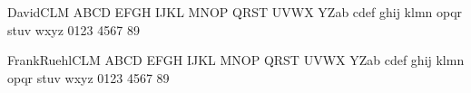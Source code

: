 \documentclass[10pt]{memoir}
\newcommand{\blInitSz}{20}
\begin{document}
DavidCLM
{\blSetDavidCLM\fontsize{\blInitSz}{40}\selectfont 
ABCD EFGH IJKL MNOP QRST UVWX  YZab cdef ghij klmn opqr stuv wxyz 0123 4567 89 \\
} 

FrankRuehlCLM
{\blSetDavidCLM\fontsize{\blInitSz}{40}\selectfont 
ABCD EFGH IJKL MNOP QRST UVWX  YZab cdef ghij klmn opqr stuv wxyz 0123 4567 89 \\
} 
\end{document}
